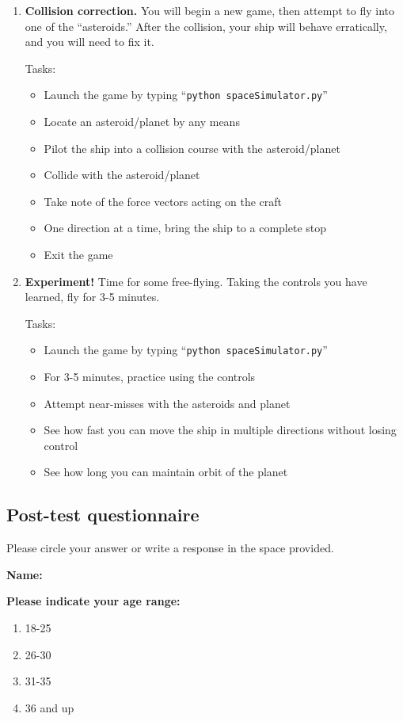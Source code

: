\begin{enumerate}
  \item \textbf{Collision correction.}  You will begin a new game, then attempt to fly into one of the ``asteroids.''  After the collision, your ship will behave erratically, and you will need to fix it.
  
  Tasks:
  \begin{itemize}
    \item Launch the game by typing ``\texttt{python spaceSimulator.py}''
    \item Locate an asteroid/planet by any means
    \item Pilot the ship into a collision course with the asteroid/planet
    \item Collide with the asteroid/planet
    \item Take note of the force vectors acting on the craft
    \item One direction at a time, bring the ship to a complete stop
    \item Exit the game
  \end{itemize}
  
  \item \textbf{Experiment!}  Time for some free-flying.  Taking the controls you have learned, fly for 3-5 minutes. 
  
  Tasks:
  \begin{itemize}
    \item Launch the game by typing ``\texttt{python spaceSimulator.py}''
    \item For 3-5 minutes, practice using the controls
    \item Attempt near-misses with the asteroids and planet
    \item See how fast you can move the ship in multiple directions without losing control
    \item See how long you can maintain orbit of the planet
  \end{itemize}

\end{enumerate}

\subsection{Post-test questionnaire}

Please circle your answer or write a response in the space provided.

\vspace{5mm}
\noindent\textbf{Name:}

\vspace{5mm}
\noindent\textbf{Please indicate your age range:}
\begin{enumerate}
  \item 18-25
  \item 26-30
  \item 31-35
  \item 36 and up
\end{enumerate}

